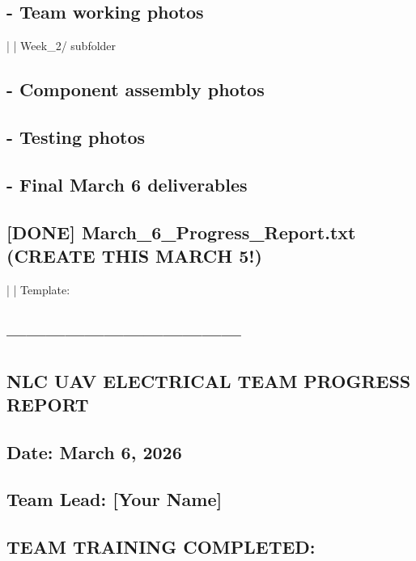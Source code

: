 \documentclass[11pt,letterpaper]{article}
\begin{document}
\subsection*{- Team working photos}

|   |       Week\_2/ subfolder\par

\subsection*{- Component assembly photos}

\subsection*{- Testing photos}

\subsection*{- Final March 6 deliverables}

\subsection*{[DONE] March\_6\_Progress\_Report.txt (CREATE THIS MARCH 5!)}

|   |       Template:\par

\subsection*{------------------------------------}

\subsection*{NLC UAV ELECTRICAL TEAM PROGRESS REPORT}

\subsection*{Date: March 6, 2026}

\subsection*{Team Lead: [Your Name]}

\subsection*{TEAM TRAINING COMPLETED:}
\end{document}
